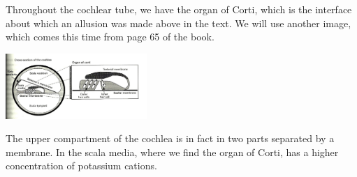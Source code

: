 Throughout the cochlear tube, we have the organ of Corti, which is the interface
about which an allusion was made above in the text. We will use another image, 
which comes this time from page 65 of the book.

\includegraphics[width=0.4\textwidth]{images/corti-aud65-level.jpg} %

The upper compartment of the cochlea is in fact in two parts separated by a membrane.
In the scala media, where we find the organ of Corti, has a higher 
concentration of potassium cations. 

